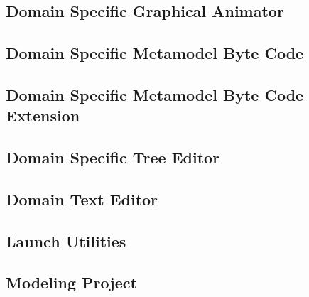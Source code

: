 \documentclass{gemoc} %
\begin{document}

\subsection{Domain Specific Graphical Animator}
\label{sec:Domain_Specific_Graphical_Animator}


\subsection{Domain Specific Metamodel Byte Code}
\label{sec:Domain_Specific_Metamodel_Byte_Code}


\subsection{Domain Specific Metamodel Byte Code Extension}
\label{sec:Domain_Specific_Metamodel_Byte_Code_Extension}


\subsection{Domain Specific Tree Editor}
\label{sec:Domain_Specific_Tree_Editor}


\subsection{Domain Text Editor}
\label{sec:Domain_Text_Editor}


\subsection{Launch Utilities}
\label{sec:Launch_Utilities}


\subsection{Modeling Project}
\label{sec:Modeling_Project}
\end{document}
